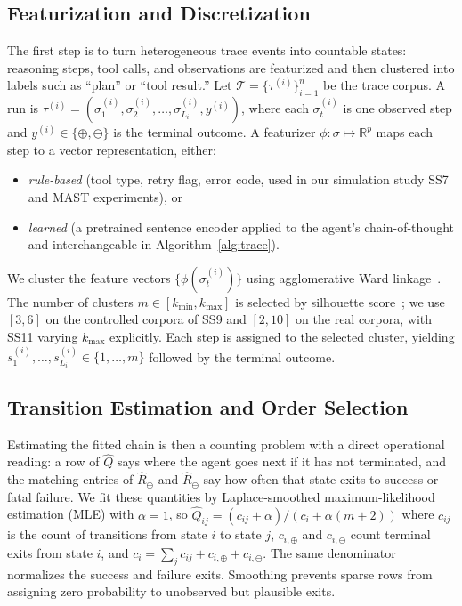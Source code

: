 \subsection{Featurization and Discretization}
\label{sec:featurization}

The first step is to turn heterogeneous trace events into countable
states: reasoning steps, tool calls, and observations are featurized
and then clustered into labels such as ``plan'' or ``tool result.'' Let
$\mathcal{T} = \{\tau^{(i)}\}_{i=1}^{n}$ be the trace corpus. A run is
$\tau^{(i)} = (\sigma_1^{(i)}, \sigma_2^{(i)}, \ldots,
\sigma_{L_i}^{(i)}, y^{(i)})$, where each $\sigma_t^{(i)}$ is one
observed step and $y^{(i)} \in \{\oplus, \ominus\}$ is the terminal
outcome. A featurizer $\phi : \sigma \mapsto \mathbb{R}^p$ maps each
step to a vector representation, either:
\begin{itemize}
  \item \emph{rule-based} (tool type, retry flag, error code, used in
        our simulation study SS7 and MAST experiments), or
  \item \emph{learned} (a pretrained sentence encoder applied to the
        agent's chain-of-thought and interchangeable in
        Algorithm~\ref{alg:trace}).
\end{itemize}
We cluster the feature vectors $\{\phi(\sigma_t^{(i)})\}$ using
agglomerative Ward linkage~\cite{ward1963}. The number of clusters
$m \in [k_{\min}, k_{\max}]$ is selected by silhouette
score~\cite{rousseeuw1987}; we use $[3,6]$ on the controlled corpora of
SS9 and $[2,10]$ on the real corpora, with SS11 varying $k_{\max}$
explicitly. Each step is assigned to the selected
cluster, yielding
$s_1^{(i)}, \ldots, s_{L_i}^{(i)} \in \{1, \ldots, m\}$ followed by
the terminal outcome.

\subsection{Transition Estimation and Order Selection}
\label{sec:order_selection}

Estimating the fitted chain is then a counting problem with a direct
operational reading: a row of $\hat Q$ says where the agent goes next
if it has not terminated, and the matching entries of $\hat R_\oplus$
and $\hat R_\ominus$ say how often that state exits to success or fatal
failure. We fit these quantities by
Laplace-smoothed maximum-likelihood estimation (MLE) with
$\alpha=1$, so
$\hat{Q}_{ij} = (c_{ij} + \alpha) / (c_i + \alpha(m+2))$
where $c_{ij}$ is the count of transitions from state $i$ to state
$j$, $c_{i,\oplus}$ and $c_{i,\ominus}$ count terminal exits from
state $i$, and
$c_i = \sum_j c_{ij} + c_{i,\oplus}+c_{i,\ominus}$. The same
denominator normalizes the success and failure exits. Smoothing
prevents sparse rows from assigning zero probability to unobserved but
plausible exits.

